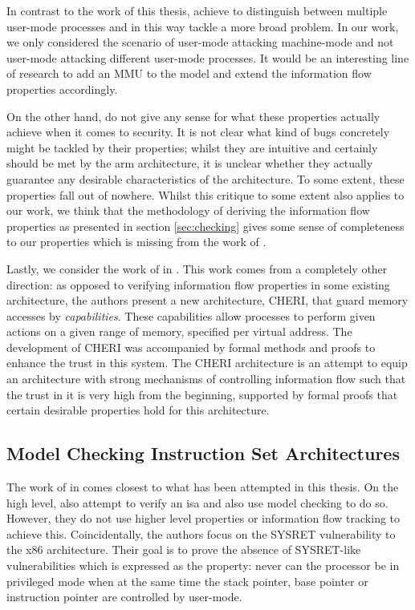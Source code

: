 In contrast to the work of this thesis, \citeauthor{KhakpourSD13} achieve to distinguish between multiple user-mode processes and in this way tackle a more broad problem.
In our work, we only considered the scenario of user-mode attacking machine-mode and not user-mode attacking different user-mode processes.
It would be an interesting line of research to add an MMU to the model and extend the information flow properties accordingly.

On the other hand, \citeauthor{KhakpourSD13} do not give any sense for what these properties actually achieve when it comes to security.
It is not clear what kind of bugs concretely might be tackled by their properties; whilst they are intuitive and certainly should be met by the \gls{arm} architecture, it is unclear whether they actually guarantee any desirable characteristics of the architecture.
To some extent, these properties fall out of nowhere.
Whilst this critique to some extent also applies to our work, we think that the methodology of deriving the information flow properties as presented in section \ref{sec:checking} gives some sense of completeness to our properties which is missing from the work of \citeauthor{KhakpourSD13}.

Lastly, we consider the work of \citeauthor{Nienhuis19} in  \cite{Nienhuis19}.
This work comes from a completely other direction: as opposed to verifying information flow properties in some existing architecture, the authors present a new architecture, CHERI, that guard memory accesses by \textit{capabilities}.
These capabilities allow processes to perform given actions on a given range of memory, specified per virtual address.
The development of CHERI was accompanied by formal methods and proofs to enhance the trust in this system.
The CHERI architecture is an attempt to equip an architecture with strong mechanisms of controlling information flow such that the trust in it is very high from the beginning, supported by formal proofs that certain desirable properties hold for this architecture.

\subsection{Model Checking Instruction Set Architectures}
\label{sec:related-model-checking}

The work of \citeauthor{BradfieldS16} in  \cite{BradfieldS16} comes closest to what has been attempted in this thesis.
On the high level, \citeauthor{BradfieldS16} also attempt to verify an \gls{isa} and also use model checking to do so.
However, they do not use higher level properties or information flow tracking to achieve this.
Coincidentally, the authors focus on the SYSRET vulnerability to the x86 architecture.
Their goal is to prove the absence of SYSRET-like vulnerabilities which is expressed as the property: never can the processor be in privileged mode when at the same time the stack pointer, base pointer or instruction pointer are controlled by user-mode.

